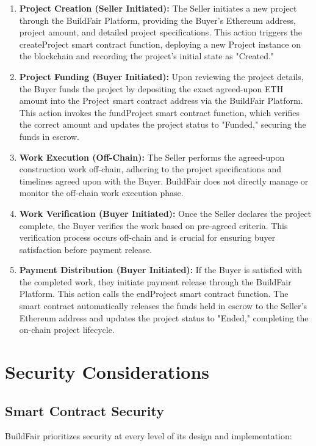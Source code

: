 \documentclass[12pt]{article}
\begin{document}
\begin{enumerate}
    \item \textbf{Project Creation (Seller Initiated):} The Seller initiates a new project through the BuildFair Platform, providing the Buyer's Ethereum address, project amount, and detailed project specifications. This action triggers the createProject smart contract function, deploying a new Project instance on the blockchain and recording the project's initial state as "Created."
    
    \item \textbf{Project Funding (Buyer Initiated):} Upon reviewing the project details, the Buyer funds the project by depositing the exact agreed-upon ETH amount into the Project smart contract address via the BuildFair Platform. This action invokes the fundProject smart contract function, which verifies the correct amount and updates the project status to "Funded," securing the funds in escrow.
    
    \item \textbf{Work Execution (Off-Chain):} The Seller performs the agreed-upon construction work off-chain, adhering to the project specifications and timelines agreed upon with the Buyer. BuildFair does not directly manage or monitor the off-chain work execution phase.
    
    \item \textbf{Work Verification (Buyer Initiated):} Once the Seller declares the project complete, the Buyer verifies the work based on pre-agreed criteria. This verification process occurs off-chain and is crucial for ensuring buyer satisfaction before payment release.
    
    \item \textbf{Payment Distribution (Buyer Initiated):} If the Buyer is satisfied with the completed work, they initiate payment release through the BuildFair Platform. This action calls the endProject smart contract function. The smart contract automatically releases the funds held in escrow to the Seller's Ethereum address and updates the project status to "Ended," completing the on-chain project lifecycle.
\end{enumerate}

\section{Security Considerations}
\subsection{Smart Contract Security}
BuildFair prioritizes security at every level of its design and implementation:
\end{document}
